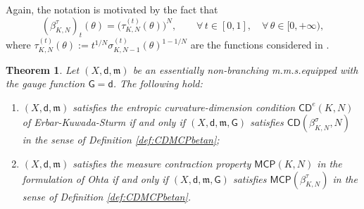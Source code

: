 \documentclass[11pt,a4paper]{article}
\theoremstyle{plain}
\newtheorem{theorem}{Theorem}[section]
\theoremstyle{definition}
\theoremstyle{remark}
\numberwithin{equation}{section}
\newcommand{\CD}{\mathsf{CD}}
\newcommand{\MCP}{\mathsf{MCP}}
\newcommand{\mm}{\mathfrak m}
\newcommand{\sfd}{\mathsf d}
\newcommand{\sfG}{\mathsf G}
\begin{document}
Again, the notation is motivated by the fact that
\begin{equation}\label{eq:barbetatau}
(\beta_{K,N}^{\tau})_t(\theta) = \big(\tau_{K,N}^{(t)}(\theta)\big)^N, \qquad \forall\, t\in [0,1],\quad \forall\, \theta \in [0,+\infty),
\end{equation}
where $ \tau_{K,N}^{(t)}(\theta):= t^{1/N} \sigma^{(t)}_{K, N-1}(\theta)^{1-1/N}$ are the functions considered in \cite{sturm:II}.

\begin{theorem}\label{thm:CDbetaVsLSV}
Let $(X,\sfd,\mm)$ be an essentially non-branching m.m.s.\@ equipped with the gauge function $\sfG=\sfd$. The following hold:
\begin{enumerate}[label=(\roman*)]
\item \label{CDbetaVsLSV-i-ii} $(X,\sfd,\mm)$ satisfies the entropic curvature-dimension condition $\CD^{e}(K,N)$ of Er\-bar-Kuwada-Sturm \cite{EKS} if and only if $(X,\sfd,\mm, \sfG)$ satisfies $\CD(\beta_{K,N}^{\sigma}, N)$ in the sense of Definition \ref{def:CDMCPbetan};
\item \label{CDbetaVsLSV-iii} $(X,\sfd,\mm)$ satisfies the measure contraction property $\MCP(K,N)$ in the formulation of Ohta \cite{OhtaMCP} if and only if $(X,\sfd,\mm, \sfG)$ satisfies $\MCP(\beta_{K,N}^{\tau})$ in the sense of Definition \ref{def:CDMCPbetan}.
\end{enumerate}
\end{theorem}
\end{document}
